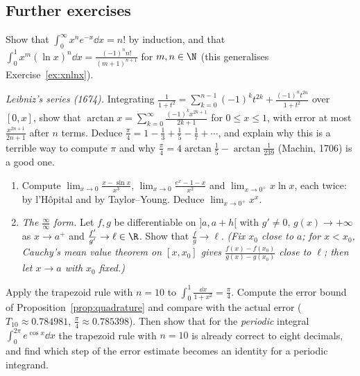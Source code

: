 \subsection*{Further exercises}

\begin{exercise}[$\star$]\label{ex:xnex}
Show that $\displaystyle\int_0^\infty x^ne^{-x}\dd x=n!$ by induction, and that $\displaystyle\int_0^1x^m(\ln x)^n\dd x=\frac{(-1)^nn!}{(m+1)^{n+1}}$ for $m,n\in\N$ (this generalises Exercise~\ref{ex:xnlnx}).
\end{exercise}

\begin{exercise}[$\star$]\label{ex:leibnizpi}
\emph{Leibniz's series (1674).} Integrating $\frac1{1+t^2}=\sum_{k=0}^{n-1}(-1)^kt^{2k}+\frac{(-1)^nt^{2n}}{1+t^2}$ over $[0,x]$, show that $\arctan x=\sum_{k=0}^\infty\frac{(-1)^kx^{2k+1}}{2k+1}$ for $0\le x\le1$, with error at most $\frac{x^{2n+1}}{2n+1}$ after $n$ terms. Deduce $\frac\pi4=1-\frac13+\frac15-\frac17+\cdots$, and explain why this is a terrible way to compute $\pi$ and why $\frac\pi4=4\arctan\frac15-\arctan\frac1{239}$ (Machin, 1706) is a good one.
\end{exercise}

\begin{exercise}[$\star\star$]\label{ex:lhopital}
\begin{enumerate}[label=(\alph*)]
\item Compute $\lim_{x\to0}\frac{x-\sin x}{x^3}$, $\lim_{x\to0}\frac{e^x-1-x}{x^2}$ and $\lim_{x\to0^+}x\ln x$, each twice: by l'H\^opital and by Taylor--Young. Deduce $\lim_{x\to0^+}x^x$.
\item \emph{The $\frac\infty\infty$ form.} Let $f,g$ be differentiable on $]a,a+h[$ with $g'\ne0$, $g(x)\to+\infty$ as $x\to a^+$ and $\frac{f'}{g'}\to\ell\in\R$. Show that $\frac fg\to\ell$. \emph{(Fix $x_0$ close to $a$; for $x<x_0$, Cauchy's mean value theorem on $[x,x_0]$ gives $\frac{f(x)-f(x_0)}{g(x)-g(x_0)}$ close to $\ell$; then let $x\to a$ with $x_0$ fixed.)}
\end{enumerate}
\end{exercise}

\begin{exercise}[$\star\star$]\label{ex:trapezoid}
Apply the trapezoid rule with $n=10$ to $\displaystyle\int_0^1\frac{\dd x}{1+x^2}=\frac\pi4$. Compute the error bound of Proposition~\ref{prop:quadrature} and compare with the actual error ($T_{10}\approx0.784981$, $\frac\pi4\approx0.785398$). Then show that for the \emph{periodic} integral $\int_0^{2\pi}e^{\cos x}\dd x$ the trapezoid rule with $n=10$ is already correct to eight decimals, and find which step of the error estimate becomes an identity for a periodic integrand.
\end{exercise}

